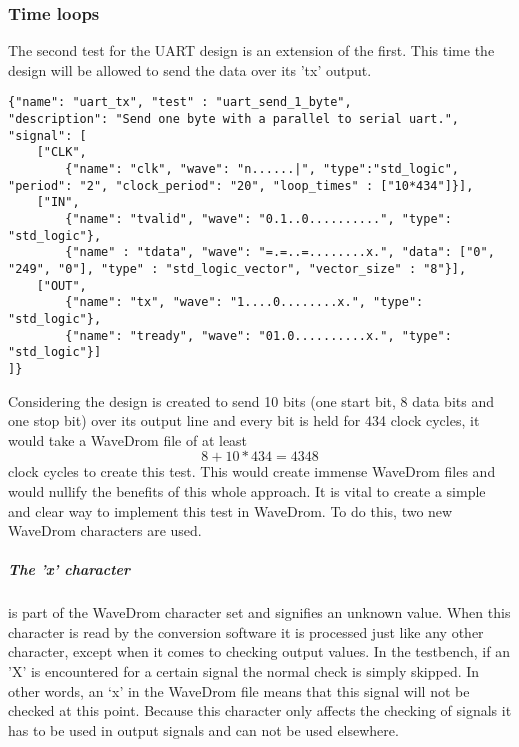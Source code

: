 \subsubsection{Time loops}
The second test for the UART design is an extension of the first. This time the design will be allowed to send the data over its 'tx' output.
\begin{lstlisting}[style=json, caption={Source file for creating a second transmission test for the UART design in \ref{appendix:uart}}, label={json:uart_wait}]
{"name": "uart_tx", "test" : "uart_send_1_byte", 
"description": "Send one byte with a parallel to serial uart.", 
"signal": [
	["CLK",
		{"name": "clk", "wave": "n......|", "type":"std_logic", "period": "2", "clock_period": "20", "loop_times" : ["10*434"]}],
	["IN",
		{"name": "tvalid", "wave": "0.1..0..........", "type": "std_logic"},
		{"name" : "tdata", "wave": "=.=..=........x.", "data": ["0", "249", "0"], "type" : "std_logic_vector", "vector_size" : "8"}],
	["OUT",
		{"name": "tx", "wave": "1....0........x.", "type": "std_logic"},
		{"name": "tready", "wave": "01.0..........x.", "type": "std_logic"}]
]}
\end{lstlisting}\noindent
{}\newpage\noindent
Considering the design is created to send 10 bits (one start bit, 8 data bits and one stop bit) over its output line and every bit is held for 434 clock cycles, it would take a WaveDrom file of at least
\begin{equation}
	8 + 10 * 434 = 4348
\end{equation}
clock cycles to create this test. This would create immense WaveDrom files and would nullify the benefits of this whole approach. It is vital to create a simple and clear way to implement this test in WaveDrom. To do this, two new WaveDrom characters are used.
\subparagraph{The 'x' character} is part of the WaveDrom character set and signifies an unknown value. When this character is read by the conversion software it is processed just like any other character, except when it comes to checking output values. In the testbench, if an 'X' is encountered for a certain signal the normal check is simply skipped. In other words, an ‘x’ in the WaveDrom file means that this signal will not be checked at this point. Because this character only affects the checking of signals it has to be used in output signals and can not be used elsewhere.


